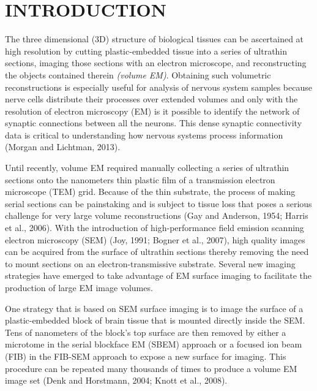 \documentclass{article}
\begin{document}
\section*{INTRODUCTION}

The three dimensional (3D) structure of biological tissues can be ascertained at high resolution by cutting plastic-embedded tissue into a series of ultrathin sections, imaging those sections with an electron microscope, and reconstructing the objects contained therein \emph{(volume EM)}. Obtaining such volumetric reconstructions is especially useful for analysis of nervous system samples because nerve cells distribute their processes over extended volumes and only with the resolution of electron microscopy (EM) is it possible to identify the network of synaptic connections between all the neurons. This dense synaptic connectivity data is critical to understanding how nervous systems process information (Morgan and Lichtman, 2013).

Until recently, volume EM required manually collecting a series of ultrathin sections onto the nanometers thin plastic film of a transmission electron microscope (TEM) grid. Because of the thin substrate, the process of making serial sections can be painstaking and is subject to tissue loss that poses a serious challenge for very large volume reconstructions (Gay and Anderson, 1954; Harris et al., 2006). With the introduction of high-performance field emission scanning electron microscopy (SEM) (Joy, 1991; Bogner et al., 2007), high quality images can be acquired from the surface of ultrathin sections thereby removing the need to mount sections on an electron-transmissive substrate. Several new imaging strategies have emerged to take advantage of EM surface imaging to facilitate the production of large EM image volumes.

One strategy that is based on SEM surface imaging is to image the surface of a plastic-embedded block of brain tissue that is mounted directly inside the SEM. Tens of nanometers of the block’s top surface are then removed by either a microtome in the serial blockface EM (SBEM) approach or a focused ion beam (FIB) in the FIB-SEM approach to expose a new surface for imaging. This procedure can be repeated many thousands of times to produce a volume EM image set (Denk and Horstmann, 2004; Knott et al., 2008).
\end{document}
